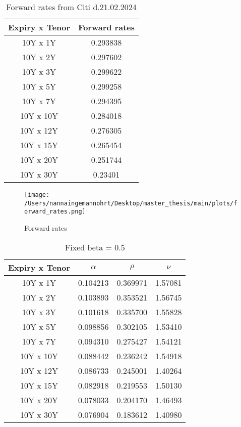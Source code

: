 \begin{table}[H]
    \centering
    \begin{tabular}{cc}
      \toprule
      \textbf{Expiry x Tenor} & \textbf{Forward rates} \\
      \midrule
      \rowcolor{lightgray!40} 10Y x 1Y &0.293838 \\
      10Y x 2Y & 0.297602\\
      \rowcolor{lightgray!40} 10Y x 3Y & 0.299622\\
      10Y x 5Y & 0.299258\\
      \rowcolor{lightgray!40} 10Y x 7Y & 0.294395\\
      10Y x 10Y & 0.284018\\
      \rowcolor{lightgray!40} 10Y x 12Y & 0.276305\\
      10Y x 15Y & 0.265454\\
      \rowcolor{lightgray!40} 10Y x 20Y & 0.251744\\
      10Y x 30Y & 0.23401\\
      \bottomrule
    \end{tabular}
    \caption{Forward rates from Citi d.21.02.2024}
    \label{tab:farward_parm}
\end{table}
\noindent

\begin{figure}[H]
    \centering
    \texttt{[image: /Users/nannaingemannohrt/Desktop/master\_thesis/main/plots/forward\_rates.png]}
    \caption{Forward rates}
    \label{fig:forward_plot}
\end{figure}

\begin{table}[H]
    \centering
    \begin{tabular}{cccc}
      \toprule
      \textbf{Expiry x Tenor } & \textbf{$\alpha$} & \textbf{$\rho$}  & \textbf{$\nu$} \\
      \midrule
      \rowcolor{lightgray!40}  10Y x 1Y &0.104213 & 0.369971 & 1.57081 \\
      10Y x 2Y &0.103893 & 0.353521 & 1.56745 \\
      \rowcolor{lightgray!40}  10Y x 3Y &0.101618 & 0.335700 & 1.55828 \\
      10Y x 5Y &0.098856 & 0.302105 & 1.53410 \\
      \rowcolor{lightgray!40} 10Y x 7Y &0.094310 & 0.275427 & 1.54121 \\
      10Y x 10Y &0.088442 & 0.236242 & 1.54918 \\
      \rowcolor{lightgray!40}  10Y x 12Y &0.086733 & 0.245001 & 1.40264 \\
      10Y x 15Y &0.082918 & 0.219553 & 1.50130 \\
      \rowcolor{lightgray!40} 10Y x 20Y &0.078033 & 0.204170 & 1.46493 \\
      10Y x 30Y &0.076904 & 0.183612 & 1.40980 \\
      \bottomrule
    \end{tabular}
    \caption{Fixed beta = 0.5}
    \label{tab:beta_0.5}
\end{table}
\noindent

